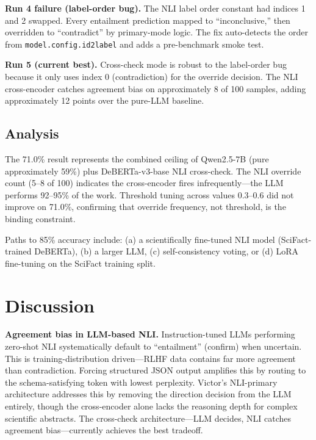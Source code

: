 \documentclass[letterpaper]{article}          %
\theoremstyle{plain}
\theoremstyle{definition}
\theoremstyle{remark}
\begin{document}
\textbf{Run 4 failure (label-order bug).} The NLI label order constant had
indices 1 and 2 swapped. Every entailment prediction mapped to ``inconclusive,''
then overridden to ``contradict'' by primary-mode logic. The fix auto-detects the
order from \texttt{model.config.id2label} and adds a pre-benchmark smoke test.

\textbf{Run 5 (current best).} Cross-check mode is robust to the label-order bug
because it only uses index 0 (contradiction) for the override decision. The NLI
cross-encoder catches agreement bias on approximately 8 of 100 samples, adding
approximately 12 points over the pure-LLM baseline.

\subsection{Analysis}

The 71.0\% result represents the combined ceiling of Qwen2.5-7B (pure
approximately 59\%) plus DeBERTa-v3-base NLI cross-check. The NLI override count
(5--8 of 100) indicates the cross-encoder fires infrequently---the LLM performs
92--95\% of the work. Threshold tuning across values 0.3--0.6 did not improve on
71.0\%, confirming that override frequency, not threshold, is the binding
constraint.

Paths to 85\% accuracy include: (a) a scientifically fine-tuned NLI model
(SciFact-trained DeBERTa), (b) a larger LLM, (c) self-consistency voting, or
(d) LoRA fine-tuning on the SciFact training split.


\section{Discussion}

\textbf{Agreement bias in LLM-based NLI.} Instruction-tuned LLMs performing
zero-shot NLI systematically default to ``entailment'' (confirm) when uncertain.
This is training-distribution driven---RLHF data contains far more agreement than
contradiction. Forcing structured JSON output amplifies this by routing to the
schema-satisfying token with lowest perplexity. Victor's NLI-primary architecture
addresses this by removing the direction decision from the LLM entirely, though
the cross-encoder alone lacks the reasoning depth for complex scientific abstracts.
The cross-check architecture---LLM decides, NLI catches agreement bias---currently
achieves the best tradeoff.
\end{document}

